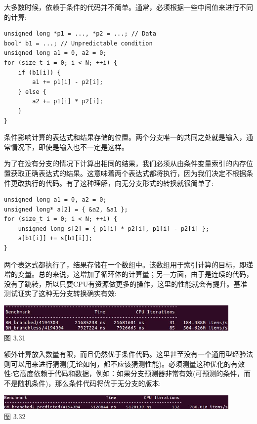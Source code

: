 
大多数时候，依赖于条件的代码并不简单。通常，必须根据一些中间值来进行不同的计算:

\begin{lstlisting}[style=styleCXX]
unsigned long *p1 = ..., *p2 = ...; // Data
bool* b1 = ...; // Unpredictable condition
unsigned long a1 = 0, a2 = 0;
for (size_t i = 0; i < N; ++i) {
	if (b1[i]) {
		a1 += p1[i] - p2[i];
	} else {
		a2 += p1[i] * p2[i];
	}
}
\end{lstlisting}

条件影响计算的表达式和结果存储的位置。两个分支唯一的共同之处就是输入，通常情况下，即使是输入也不一定是这样。

为了在没有分支的情况下计算出相同的结果，我们必须从由条件变量索引的内存位置获取正确表达式的结果。这意味着两个表达式都将执行，因为我们决定不根据条件更改执行的代码。有了这种理解，向无分支形式的转换就很简单了:

\begin{lstlisting}[style=styleCXX]
unsigned long a1 = 0, a2 = 0;
unsigned long* a[2] = { &a2, &a1 };
for (size_t i = 0; i < N; ++i) {
	unsigned long s[2] = { p1[i] * p2[i], p1[i] - p2[i] };
	a[b1[i]] += s[b1[i]];
}
\end{lstlisting}

两个表达式都执行了，结果存储在一个数组中。该数组用于索引计算的目标，即递增的变量。总的来说，这增加了循环体的计算量；另一方面，由于是连续的代码，没有了跳转，所以只要CPU有资源做更多的操作，这里的性能就会有提升。基准测试证实了这种无分支转换确实有效:

\begin{center}
\includegraphics[width=0.9\textwidth]{content/1/chapter3/images/31.jpg}\\
图 3.31
\end{center}

额外计算放入数量有限，而且仍然优于条件代码。这里甚至没有一个通用型经验法则可以用来进行猜测(无论如何，都不应该猜测性能)。必须测量这种优化的有效性:它高度依赖于代码和数据，例如：如果分支预测器非常有效(可预测的条件，而不是随机条件)，那么条件代码将优于无分支的版本:

\begin{center}
\includegraphics[width=0.9\textwidth]{content/1/chapter3/images/32.jpg}\\
图 3.32
\end{center}

